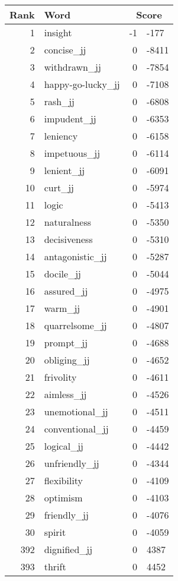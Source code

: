 \begin{longtable}[!htbp]{| rlr@{.}l |}
    \hline
    \textbf{Rank} & \textbf{Word} & \multicolumn{2}{c|}{\textbf{Score}} \\
    \hline
    \endhead
    1 & insight & -1 & -177 \\
    2 & concise\_jj & 0 & -8411 \\
    3 & withdrawn\_jj & 0 & -7854 \\
    4 & happy-go-lucky\_jj & 0 & -7108 \\
    5 & rash\_jj & 0 & -6808 \\
    6 & impudent\_jj & 0 & -6353 \\
    7 & leniency & 0 & -6158 \\
    8 & impetuous\_jj & 0 & -6114 \\
    9 & lenient\_jj & 0 & -6091 \\
    10 & curt\_jj & 0 & -5974 \\
    11 & logic & 0 & -5413 \\
    12 & naturalness & 0 & -5350 \\
    13 & decisiveness & 0 & -5310 \\
    14 & antagonistic\_jj & 0 & -5287 \\
    15 & docile\_jj & 0 & -5044 \\
    16 & assured\_jj & 0 & -4975 \\
    17 & warm\_jj & 0 & -4901 \\
    18 & quarrelsome\_jj & 0 & -4807 \\
    19 & prompt\_jj & 0 & -4688 \\
    20 & obliging\_jj & 0 & -4652 \\
    21 & frivolity & 0 & -4611 \\
    22 & aimless\_jj & 0 & -4526 \\
    23 & unemotional\_jj & 0 & -4511 \\
    24 & conventional\_jj & 0 & -4459 \\
    25 & logical\_jj & 0 & -4442 \\
    26 & unfriendly\_jj & 0 & -4344 \\
    27 & flexibility & 0 & -4109 \\
    28 & optimism & 0 & -4103 \\
    29 & friendly\_jj & 0 & -4076 \\
    30 & spirit & 0 & -4059 \\
    392 & dignified\_jj & 0 & 4387 \\
    393 & thrift & 0 & 4452 \\

\end{longtable}
